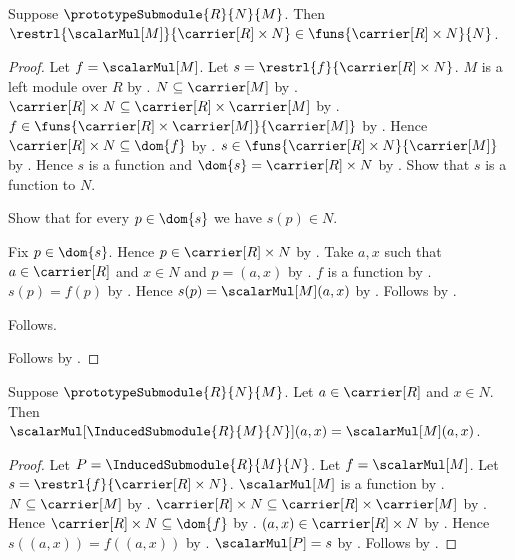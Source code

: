 \begin{proposition}\label{spike_induced_scalar_type}
    Suppose $\prototypeSubmodule{R}{N}{M}$.
    Then
        $\restrl{\scalarMul[M]}{\carrier[R]\times N}
            \in\funs{\carrier[R]\times N}{N}$.
\end{proposition}
\begin{proof}
    Let $f=\scalarMul[M]$.
    Let $s=\restrl{f}{\carrier[R]\times N}$.
    $M$ is a left module over $R$ by
        .
    $N\subseteq\carrier[M]$ by
        .
    $\carrier[R]\times N
        \subseteq\carrier[R]\times\carrier[M]$ by
        .
    $f\in\funs{\carrier[R]\times\carrier[M]}{\carrier[M]}$ by
        .
    Hence $\carrier[R]\times N\subseteq\dom{f}$ by .
    $s\in\funs{\carrier[R]\times N}{\carrier[M]}$ by
        .
    Hence $s$ is a function and
        $\dom{s}=\carrier[R]\times N$ by .
    Show that $s$ is a function to $N$.
    \begin{subproof}
        Show that for every $p\in\dom{s}$ we have $s(p)\in N$.
        \begin{subproof}
            Fix $p\in\dom{s}$.
            Hence $p\in\carrier[R]\times N$ by \auto.
            Take $a,x$ such that $a\in\carrier[R]$ and $x\in N$ and
                $p=(a,x)$ by .
            $f$ is a function by .
            $s(p)=f(p)$ by .
            Hence $s(p)=\scalarMul[M](a,x)$ by \auto.
            Follows by .
        \end{subproof}
        Follows.
    \end{subproof}
    Follows by .
\end{proof}

\begin{proposition}\label{spike_induced_scalar_apply}
    Suppose $\prototypeSubmodule{R}{N}{M}$.
    Let $a\in\carrier[R]$ and $x\in N$.
    Then
        $\scalarMul[\InducedSubmodule{R}{M}{N}](a,x)
            =\scalarMul[M](a,x)$.
\end{proposition}
\begin{proof}
    Let $P=\InducedSubmodule{R}{M}{N}$.
    Let $f=\scalarMul[M]$.
    Let $s=\restrl{f}{\carrier[R]\times N}$.
    $\scalarMul[M]$ is a function by
        .
    $N\subseteq\carrier[M]$ by
        .
    $\carrier[R]\times N
        \subseteq\carrier[R]\times\carrier[M]$ by
        .
    Hence $\carrier[R]\times N\subseteq\dom{f}$ by
        .
    $(a,x)\in\carrier[R]\times N$ by .
    Hence $s((a,x))=f((a,x))$ by
        .
    $\scalarMul[P]=s$ by
        .
    Follows by \auto.
\end{proof}

